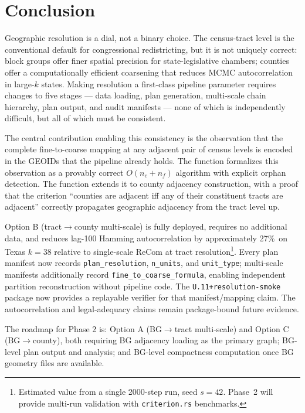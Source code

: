 \section{Conclusion}
\label{sec:conclusion}

Geographic resolution is a dial, not a binary choice.
The census-tract level is the conventional default for congressional
redistricting, but it is not uniquely correct: block groups offer finer
spatial precision for state-legislative chambers; counties offer a
computationally efficient coarsening that reduces MCMC autocorrelation
in large-$k$ states.
Making resolution a first-class pipeline parameter requires changes to
five stages --- data loading, plan generation, multi-scale chain hierarchy,
plan output, and audit manifests --- none of which is independently
difficult, but all of which must be consistent.

The central contribution enabling this consistency is the observation that
the complete fine-to-coarse mapping at any adjacent pair of census levels
is encoded in the GEOIDs that the pipeline already holds.
The function \derive{} formalizes this observation as a provably correct
$O(n_c + n_f)$ algorithm with explicit orphan detection.
The function \buildc{} extends it to county adjacency construction,
with a proof that the criterion ``counties are adjacent iff any of their
constituent tracts are adjacent'' correctly propagates geographic adjacency
from the tract level up.

Option B (tract$\to$county multi-scale) is fully deployed, requires no
additional data, and reduces lag-100 Hamming autocorrelation by
approximately 27\%\est\ on Texas $k=38$ relative to single-scale ReCom
at tract resolution\footnote{\est Estimated value from a single 2000-step run,
seed $s=42$. Phase~2 will provide multi-run validation with \texttt{criterion.rs}
benchmarks.}.
Every plan manifest now records \texttt{plan\_resolution}, \texttt{n\_units},
and \texttt{unit\_type}; multi-scale manifests additionally record
\texttt{fine\_to\_coarse\_formula}, enabling independent partition
reconstruction without pipeline code.
The \texttt{U.11+resolution-smoke} package now provides a replayable verifier
for that manifest/mapping claim.  The autocorrelation and legal-adequacy claims
remain package-bound future evidence.

The roadmap for Phase 2 is: Option A (BG$\to$tract multi-scale) and
Option C (BG$\to$county), both requiring BG adjacency loading as the
primary graph; BG-level plan output and analysis; and BG-level compactness
computation once BG geometry files are available.

